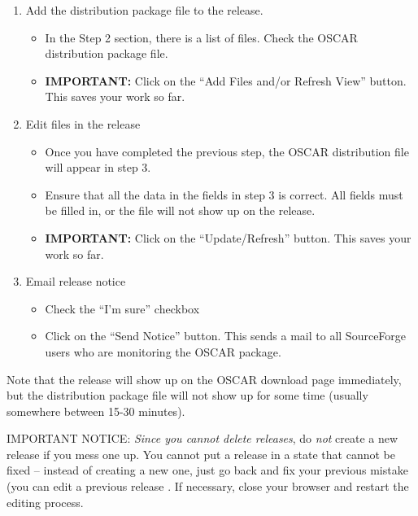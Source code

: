 \begin{enumerate}
\begin{enumerate}
  \item Add the distribution package file to the release.

    \begin{itemize}
    \item In the Step 2 section, there is a list of files.  Check the
      OSCAR distribution package file.
      
    \item {\bf IMPORTANT:} Click on the ``Add Files and/or Refresh
      View'' button.  This saves your work so far.
    \end{itemize}

  \item Edit files in the release

    \begin{itemize}
    \item Once you have completed the previous step, the OSCAR
      distribution file will appear in step 3.

    \item Ensure that all the data in the fields in step 3 is
      correct.  All fields must be filled in, or the file will not
      show up on the release.
      
    \item {\bf IMPORTANT:} Click on the ``Update/Refresh'' button.
      This saves your work so far.
    \end{itemize}

  \item Email release notice

    \begin{itemize}
    \item Check the ``I'm sure'' checkbox

    \item Click on the ``Send Notice'' button.  This sends a mail to
    all SourceForge users who are monitoring the OSCAR package.
    \end{itemize}
    
  \end{enumerate}
\end{enumerate}

Note that the release will show up on the OSCAR download page
immediately, but the distribution package file will not show up for
some time (usually somewhere between 15-30 minutes).

{\large IMPORTANT NOTICE}: {\em Since you cannot delete releases}, do
{\em not} create a new release if you mess one up.  You cannot put a
release in a state that cannot be fixed -- instead of creating a new
one, just go back and fix your previous mistake (you can edit a
previous release .  If necessary, close
your browser and restart the editing process.

